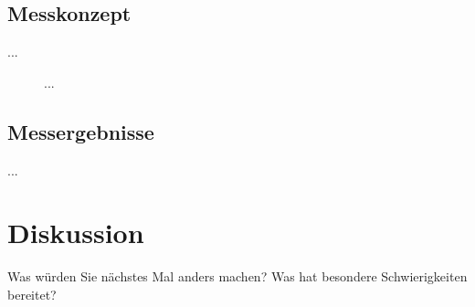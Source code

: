 \documentclass[a4paper,12pt]{article}
\begin{document}
\subsection{Messkonzept}
...

\begin{figure}[H]
    \centering
\caption{...}
\end{figure}


\subsection{Messergebnisse}
...




\section{Diskussion}
Was würden Sie nächstes Mal anders machen? Was hat besondere Schwierigkeiten bereitet?
\end{document}
